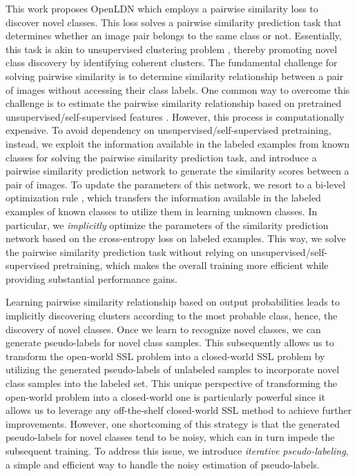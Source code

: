 \documentclass[runningheads]{eccv2022submission}
\begin{document}
This work proposes OpenLDN which employs a pairwise similarity loss to discover novel classes. This loss solves a pairwise similarity prediction task that determines whether an image pair belongs to the same class or not. Essentially, this task is akin to unsupervised clustering problem \cite{chang2017deep,wu2019deep}, thereby promoting novel class discovery by identifying coherent clusters. The fundamental challenge for solving pairwise similarity is to determine similarity relationship between a pair of images without accessing their class labels. One common way to overcome this challenge is to estimate the pairwise similarity relationship based on pretrained unsupervised/self-supervised features \cite{Han2020Automatically,cao2022openworld}. However, this process is computationally expensive. To avoid dependency on unsupervised/self-supervised pretraining, instead, we exploit the information available in the labeled examples from known classes for solving the pairwise similarity prediction task, and introduce a pairwise similarity prediction network to generate the similarity scores between a pair of images. To update the parameters of this network, we resort to a bi-level optimization rule \cite{bard2013practical,guo2020safe}, which transfers the information available in the labeled examples of known classes to utilize them in learning unknown classes. In particular, we \emph{implicitly} optimize the parameters of the similarity prediction network based on the cross-entropy loss on labeled examples. This way, we solve the pairwise similarity prediction task without relying on unsupervised/self-supervised pretraining, which makes the overall training more efficient while providing substantial performance gains. 

Learning pairwise similarity relationship based on output probabilities leads to implicitly discovering clusters according to the most probable class, hence, the discovery of novel classes. Once we learn to recognize novel classes, we can generate pseudo-labels for novel class samples. This subsequently allows us to transform the open-world SSL problem into a closed-world SSL problem by utilizing the generated pseudo-labels of unlabeled samples to incorporate novel class samples into the labeled set. This unique perspective of transforming the open-world problem into a closed-world one is particularly powerful since it allows us to leverage any off-the-shelf closed-world SSL method to achieve further improvements. However, one shortcoming of this strategy is that the generated pseudo-labels for novel classes tend to be noisy, which can in turn impede the subsequent training. To address this issue, we introduce \emph{iterative pseudo-labeling}, a simple and efficient way to handle the noisy estimation of pseudo-labels.
\end{document}
